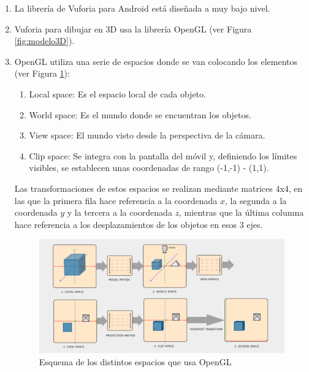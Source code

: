 \begin{enumerate}
    \item La librería de Vuforia para Android está diseñada a muy bajo nivel.
    \item Vuforia para dibujar en 3D usa la librería OpenGL (ver Figura \ref{fig:modelo3D}).
    \item OpenGL utiliza una serie de espacios donde se van colocando los elementos (ver Figura \ref{fig:esquemaOpenGl}): 
    \begin{enumerate}
        \item Local space: Es el espacio local de cada objeto.
        \item World space: Es el mundo donde se encuentran los objetos.
        \item View space: El mundo visto desde la perspectiva de la cámara.
        \item Clip space: Se integra con la pantalla del móvil y, definiendo los límites visibles, se establecen unas coordenadas de rango (-1,-1) - (1,1).
    \end{enumerate}
    
        Las transformaciones de estos espacios se realizan mediante matrices 4x4, 
        en las que la primera fila hace referencia a la coordenada $x$, la segunda a la coordenada $y$ y la 
        tercera a la coordenada $z$, mientras que la última columna hace referencia a los desplazamientos 
        de los objetos en esos 3 ejes.
            \begin{figure}[H]
                \centering
                \includegraphics[width=5in]{figures/space-transformation.png}
                \caption{Esquema de los distintos espacios que usa OpenGL\cite{spaceopengl}}
                \label{fig:esquemaOpenGl}
            \end{figure}



\end{enumerate}
